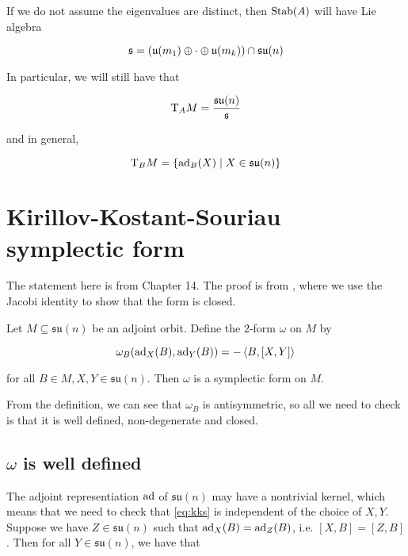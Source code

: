 \documentclass{article}
\newcommand{\su}{\mathfrak{su}}
\begin{document}
If we do not assume the eigenvalues are distinct, then \(\operatorname{Stab}(A)\) will have Lie algebra

\[\mfs = \left(\mfu(m_1) \oplus \cdot \oplus \mfu(m_k)\right) \cap \su(n)\]

In particular, we will still have that

\[\TT_A M = \frac{\su(n)}{\mfs}\]

and in general,

\[\TT_B M = \left\{\ad_B(X) \mid X \in \su(n)\right\}\]

\section{Kirillov-Kostant-Souriau symplectic form}

\label{sec:kks}

The statement here is from \cite{marsden_ratiu} Chapter 14. The proof is from \cite[Section II.1.d]{audin}, where we use the Jacobi identity to show that the form is closed.

\begin{theorem}
    
    Let \(M \subseteq \su(n)\) be an adjoint orbit. Define the \(2\)-form \(\omega\) on \( M\) by

    \begin{equation}
        \label{eq:kks}
        \omega_B(\operatorname{ad}_X(B), \operatorname{ad}_Y(B)) = -\left\langle B, [X, Y] \right\rangle
    \end{equation}

    for all \(B \in M, X, Y \in \su(n)\). Then \(\omega\) is a symplectic form on \(M\).

    \label{thm:kks}
\end{theorem}

From the definition, we can see that \(\omega_B\) is antisymmetric, so all we need to check is that it is well defined, non-degenerate and closed.

\subsection{\(\omega\) is well defined}

The adjoint representiation \(\operatorname{ad}\) of \(\su(n)\) may have a nontrivial kernel, which means that we need to check that \cref{eq:kks} is independent of the choice of \(X, Y\). Suppose we have \(Z \in \su(n)\) such that \(\operatorname{ad}_X(B) = \operatorname{ad}_Z(B)\), i.e. \([X, B] = [Z, B]\). Then for all \(Y \in \su(n)\), we have that
\end{document}
